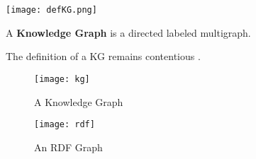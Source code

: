 \texttt{[image: defKG.png]}
\begin{definition}
    A \textbf{Knowledge Graph} is a directed labeled multigraph.
\end{definition}

\begin{remark}
    The definition of a KG remains contentious \cite{Hogan2021KG,commonsenseKG}.
\end{remark}

\begin{figure}[H]
    \centering
    \texttt{[image: kg]}
    \caption[]{A Knowledge Graph}
\end{figure}

\begin{figure}[H]
    \centering
    \texttt{[image: rdf]}
    \caption[]{An RDF Graph}
\end{figure}






